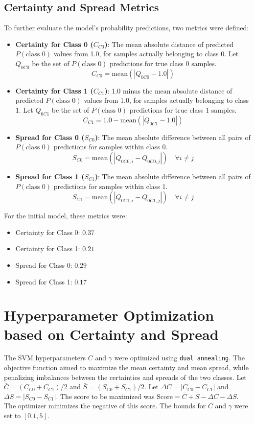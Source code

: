 \documentclass{article}
\begin{document}
\subsection{Certainty and Spread Metrics}
To further evaluate the model's probability predictions, two metrics were defined:
\begin{itemize}
    \item \textbf{Certainty for Class 0 ($C_{C0}$)}: The mean absolute distance of predicted $P(\text{class } 0)$ values from 1.0, for samples actually belonging to class 0. Let $Q_{0C0}$ be the set of $P(\text{class } 0)$ predictions for true class 0 samples.
    $$ C_{C0} = \text{mean}(|Q_{0C0} - 1.0|) $$ 
    \item \textbf{Certainty for Class 1 ($C_{C1}$)}: 1.0 minus the mean absolute distance of predicted $P(\text{class } 0)$ values from 1.0, for samples actually belonging to class 1. Let $Q_{0C1}$ be the set of $P(\text{class } 0)$ predictions for true class 1 samples.
    $$ C_{C1} = 1.0 - \text{mean}(|Q_{0C1} - 1.0|) $$ 
    \item \textbf{Spread for Class 0 ($S_{C0}$)}: The mean absolute difference between all pairs of $P(\text{class } 0)$ predictions for samples within class 0.
    $$ S_{C0} = \text{mean}(|Q_{0C0,i} - Q_{0C0,j}|) \quad \forall i \neq j $$ 
    \item \textbf{Spread for Class 1 ($S_{C1}$)}: The mean absolute difference between all pairs of $P(\text{class } 0)$ predictions for samples within class 1.
    $$ S_{C1} = \text{mean}(|Q_{0C1,i} - Q_{0C1,j}|) \quad \forall i \neq j $$ 
\end{itemize}
For the initial model, these metrics were:
\begin{itemize}
    \item Certainty for Class 0: $0.37$ 
    \item Certainty for Class 1: $0.21$ 
    \item Spread for Class 0: $0.29$ 
    \item Spread for Class 1: $0.17$ 
\end{itemize}

\section{Hyperparameter Optimization based on Certainty and Spread}
The SVM hyperparameters $C$ and $\gamma$ were optimized using \texttt{dual annealing}. The objective function aimed to maximize the mean certainty and mean spread, while penalizing imbalances between the certainties and spreads of the two classes.
Let $\bar{C} = (C_{C0} + C_{C1})/2$ and $\bar{S} = (S_{C0} + S_{C1})/2$.
Let $\Delta C = |C_{C0} - C_{C1}|$ and $\Delta S = |S_{C0} - S_{C1}|$.
The score to be maximized was $ \text{Score} = \bar{C} + \bar{S} - \Delta C - \Delta S $. The optimizer minimizes the negative of this score.
The bounds for $C$ and $\gamma$ were set to $[0.1, 5]$.
\end{document}
